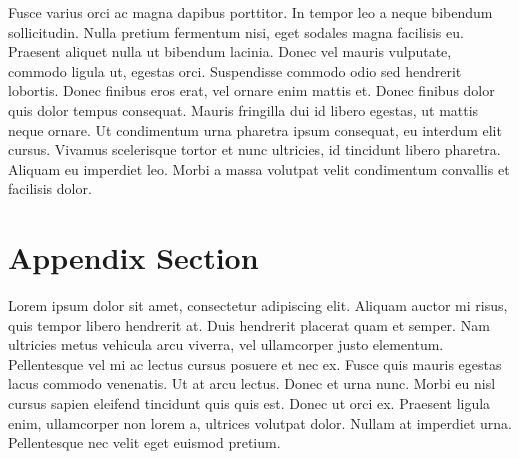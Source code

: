 \documentclass[a4paper]{CSMakotoTechnicalReport}
\begin{document}
\begin{appendices}
\begin{multicols}{2}
        Fusce varius orci ac magna dapibus porttitor. In tempor leo a neque bibendum sollicitudin. Nulla pretium fermentum nisi, eget sodales magna facilisis eu. Praesent aliquet nulla ut bibendum lacinia. Donec vel mauris vulputate, commodo ligula ut, egestas orci. Suspendisse commodo odio sed hendrerit lobortis. Donec finibus eros erat, vel ornare enim mattis et. Donec finibus dolor quis dolor tempus consequat. Mauris fringilla dui id libero egestas, ut mattis neque ornare. Ut condimentum urna pharetra ipsum consequat, eu interdum elit cursus. Vivamus scelerisque tortor et nunc ultricies, id tincidunt libero pharetra. Aliquam eu imperdiet leo. Morbi a massa volutpat velit condimentum convallis et facilisis dolor.
    \end{multicols} %

    \section{Appendix Section}

    Lorem ipsum dolor sit amet, consectetur adipiscing elit. Aliquam auctor mi risus, quis tempor libero hendrerit at. Duis hendrerit placerat quam et semper. Nam ultricies metus vehicula arcu viverra, vel ullamcorper justo elementum. Pellentesque vel mi ac lectus cursus posuere et nec ex. Fusce quis mauris egestas lacus commodo venenatis. Ut at arcu lectus. Donec et urna nunc. Morbi eu nisl cursus sapien eleifend tincidunt quis quis est. Donec ut orci ex. Praesent ligula enim, ullamcorper non lorem a, ultrices volutpat dolor. Nullam at imperdiet urna. Pellentesque nec velit eget euismod pretium.

\end{appendices}

\end{document}
